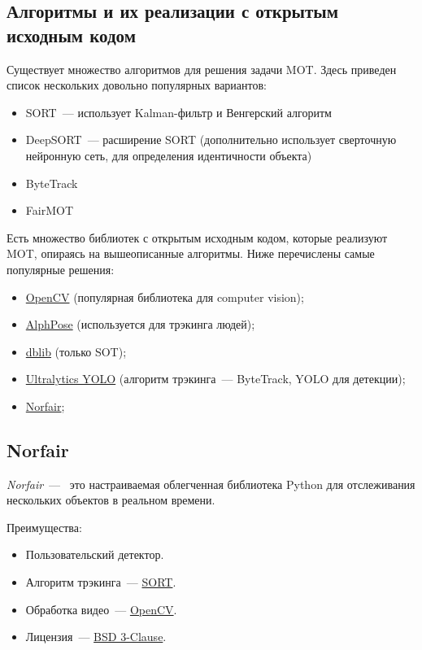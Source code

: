 \subsection{Алгоритмы и их реализации с открытым исходным кодом}

Существует множество алгоритмов для решения задачи MOT. Здесь приведен список нескольких довольно популярных вариантов:
\begin{itemize}
    \item SORT~--- использует Kalman-фильтр и Венгерский алгоритм
    \item DeepSORT~--- расширение SORT (дополнительно использует сверточную нейронную сеть, для определения идентичности объекта)
    \item ByteTrack
    \item FairMOT
\end{itemize}

Есть множество библиотек с открытым исходным кодом, которые реализуют MOT, опираясь на вышеописанные алгоритмы. Ниже перечислены самые популярные решения:
\begin{itemize}
    \item \href{https://opencv.org/}{OpenCV} (популярная библиотека для computer vision);
    \item \href{https://github.com/MVIG-SJTU/AlphaPose}{AlphPose} (используется для трэкинга людей);
    \item \href{https://github.com/davisking/dlib}{dblib} (только SOT);
    \item \href{https://docs.ultralytics.com/ru/modes/track/}{Ultralytics YOLO} (алгоритм трэкинга~--- ByteTrack, YOLO для детекции);
    \item \href{https://github.com/tryolabs/norfair}{Norfair};
\end{itemize}

\subsection{Norfair}
\emph{Norfair}~--- \ это настраиваемая облегченная библиотека Python для отслеживания нескольких объектов в реальном времени.

Преимущества:
\begin{itemize}
    \item Пользовательский детектор.
    \item Алгоритм трэкинга~--- \href{https://arxiv.org/abs/1602.00763}{SORT}.
    \item Обработка видео~---  \href{https://opencv.org/}{OpenCV}.
    \item Лицензия~---  \href{https://github.com/tryolabs/norfair/blob/master/LICENSE}{BSD 3-Clause}.
\end{itemize}

